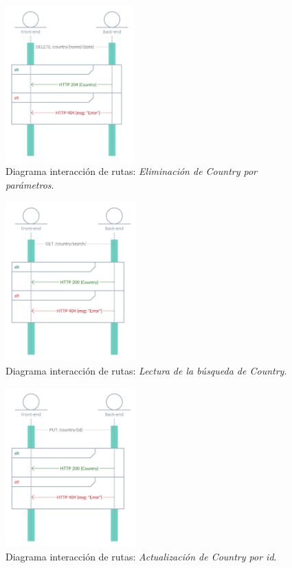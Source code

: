 \begin{figure}[H]
    \centering
    \myfloatalign
    \includegraphics[width=0.44\textwidth]{gfx/diagrama-itr5.png}
    \caption[Diagrama interacción de rutas (5)]{Diagrama interacción de rutas: \textit{Eliminación de Country por parámetros}.}\label{gfx:diagrama-itr5}
\end{figure}

\begin{figure}[H]
    \centering
    \myfloatalign
    \includegraphics[width=0.45\textwidth]{gfx/diagrama-itr6.png}
    \caption[Diagrama interacción de rutas (6)]{Diagrama interacción de rutas: \textit{Lectura de la búsqueda de Country}.}\label{gfx:diagrama-itr6}
\end{figure}

\begin{figure}[H]
    \centering
    \myfloatalign
    \includegraphics[width=0.45\textwidth]{gfx/diagrama-itr7.png}
    \caption[Diagrama interacción de rutas (7)]{Diagrama interacción de rutas: \textit{Actualización de Country por id}.}\label{gfx:diagrama-itr7}
\end{figure}

